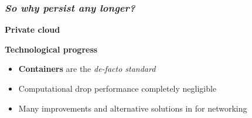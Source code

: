 \begin{frame}
  \frametitle{ \textit{So why persist any
      longer?}}

  \vspace{0.2em}
   \textbf{Private cloud}

  \pause

  \vspace{0.2em}
   \textbf{Technological progress}
  \begin{itemize}
    \itemsep0em
    \item \alert{\textbf{Containers}} are the \textit{de-facto standard}
    \item Computational drop performance completely negligible
    \item Many improvements and alternative solutions in for networking
  \end{itemize}

  \pause



\end{frame}
